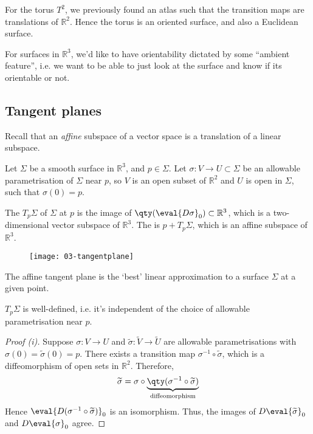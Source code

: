 \begin{example}
	For the torus $T^2$, we previously found an atlas such that the transition maps are translations of $\mathbb R^2$.
	Hence the torus is an oriented surface, and also a Euclidean surface.
\end{example} 

For surfaces in $\mathbb{R}^3$, we'd like to have orientability dictated by some ``ambient feature'', i.e. we want to be able to just look at the surface and know if its orientable or not.

\subsection{Tangent planes}
Recall that an \textit{affine} subspace of a vector space is a translation of a linear subspace.

\begin{definition}
	Let $\Sigma$ be a smooth surface in $\mathbb R^3$, and $p \in \Sigma$.
	Let $\sigma \colon V \to U \subset \Sigma$ be an allowable parametrisation of $\Sigma$ near $p$, so $V$ is an open subset of $\mathbb R^2$ and $U$ is open in $\Sigma$, such that $\sigma(0) = p$.

	The  $T_p \Sigma$ of $\Sigma$ at $p$ is the image of $\qty(\eval{D\sigma}_0) \subset \mathbb R^3$, which is a two-dimensional vector subspace of $\mathbb R^3$.
	The  is $p + T_p \Sigma$, which is an affine subspace of $\mathbb R^3$.
\end{definition}

\begin{figure}[h] 
    \centering 
    \texttt{[image: 03-tangentplane]} 
\end{figure}

\begin{remark}
	The affine tangent plane is the `best' linear approximation to a surface $\Sigma$ at a given point.
\end{remark}

\begin{lemma} \label{lem:1.9}
	$T_p \Sigma$ is well-defined, i.e. it's independent of the choice of allowable parametrisation near $p$.
\end{lemma}

\begin{proof}[Proof (i)]
	Suppose $\sigma \colon V \to U$ and $\widetilde \sigma \colon \widetilde V \to \widetilde U$ are allowable parametrisations with $\sigma(0) = \widetilde \sigma(0) = p$.
	There exists a transition map $\sigma^{-1} \circ \widetilde \sigma$, which is a diffeomorphism of open sets in $\mathbb R^2$.
	Therefore,
	\begin{align*}
		\widetilde \sigma = \sigma \circ \underbrace{\qty(\sigma^{-1} \circ \widetilde \sigma)}_{\text{diffeomorphism}}
	\end{align*}
	Hence $\eval{D(\sigma^{-1} \circ \widetilde \sigma)}_{0}$ is an isomorphism.
	Thus, the images of $D \eval{\widetilde \sigma}_0$ and $D \eval{\sigma}_0$ agree.
\end{proof}

